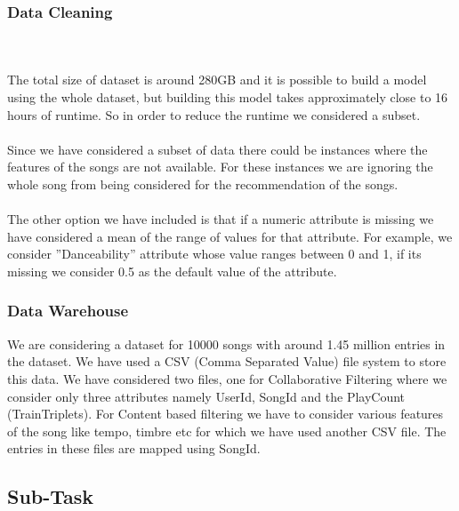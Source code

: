 \documentclass{sig-alternate-05-2015}
\begin{document}
\subsubsection {Data Cleaning}\\\\
The total size of dataset is around 280GB and it is possible to build a model using the whole dataset, but building this model takes approximately close to 16 hours of runtime. So in order to reduce the runtime we considered a subset.\\\\
Since we have considered a subset of data there could be instances where the features of the songs are not available. For these instances we are ignoring the whole song from being considered for the recommendation of the songs.\\\\
The other option we have included is that if a numeric attribute is missing we have considered a mean of the range of values for that attribute. For example, we consider ''Danceability'' attribute whose value ranges between 0 and 1, if its missing we consider 0.5 as the default value of the attribute.\\
\subsubsection {Data Warehouse}
We are considering a dataset for 10000 songs with around 1.45 million entries in the dataset. We have used a CSV (Comma Separated Value) file system to store this data. We have considered two files, one for Collaborative Filtering where we consider only three attributes namely UserId, SongId and the PlayCount (TrainTriplets). For Content based filtering we have to consider various features of the song like tempo, timbre etc for which we have used another CSV file. The entries in these files are mapped using SongId.

\subsection{Sub-Task}
\end{document}
